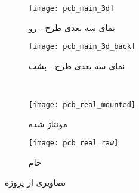  \begin{figure}[h]
 	\centering
 	\begin{subfigure}{0.45\textwidth}
 		\centering
 		\texttt{[image: pcb\_main\_3d]}
 		\caption{نمای سه بعدی طرح - رو}
 	\end{subfigure}
 	\begin{subfigure}{0.45\textwidth}
 		\centering
 		\texttt{[image: pcb\_main\_3d\_back]}
 		\caption{نمای سه بعدی طرح - پشت}
 	\end{subfigure}\\
	\begin{subfigure}{0.45\textwidth}
		\centering
		\texttt{[image: pcb\_real\_mounted]}
		\caption{\pcbf مونتاژ شده}
	\end{subfigure}
	\begin{subfigure}{0.45\textwidth}
		\centering
		\texttt{[image: pcb\_real\_raw]}
		\caption{\pcbf خام}
	\end{subfigure}
 	\caption{تصاویری از \pcbf پروژه}
 	\label{fig:pcb-images}
 \end{figure}
 
